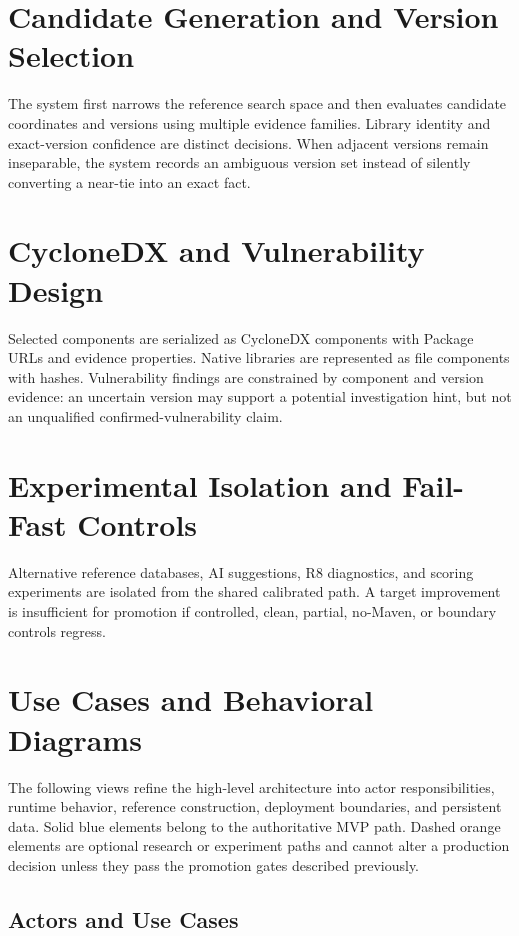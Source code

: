 \section{Candidate Generation and Version Selection}

The system first narrows the reference search space and then evaluates
candidate coordinates and versions using multiple evidence families. Library
identity and exact-version confidence are distinct decisions. When adjacent
versions remain inseparable, the system records an ambiguous version set
instead of silently converting a near-tie into an exact fact.

\section{CycloneDX and Vulnerability Design}

Selected components are serialized as CycloneDX components with Package URLs
and evidence properties. Native libraries are represented as file components
with hashes. Vulnerability findings are constrained by component and version
evidence: an uncertain version may support a potential investigation hint, but
not an unqualified confirmed-vulnerability claim.

\section{Experimental Isolation and Fail-Fast Controls}

Alternative reference databases, AI suggestions, R8 diagnostics, and scoring
experiments are isolated from the shared calibrated path. A target improvement
is insufficient for promotion if controlled, clean, partial, no-Maven, or
boundary controls regress.

\section{Use Cases and Behavioral Diagrams}

The following views refine the high-level architecture into actor
responsibilities, runtime behavior, reference construction, deployment
boundaries, and persistent data. Solid blue elements belong to the
authoritative MVP path. Dashed orange elements are optional research or
experiment paths and cannot alter a production decision unless they pass the
promotion gates described previously.

\subsection{Actors and Use Cases}

